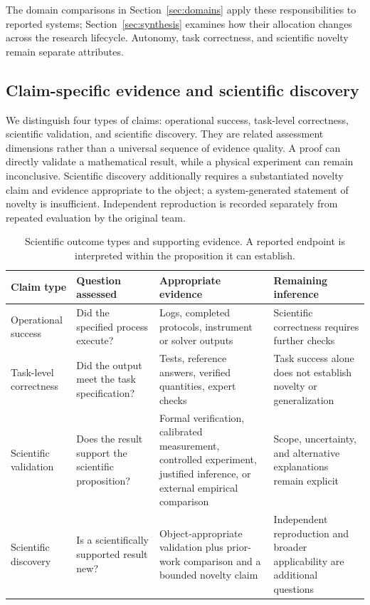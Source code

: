 The domain comparisons in Section~\ref{sec:domains} apply these responsibilities to reported systems; Section~\ref{sec:synthesis} examines how their allocation changes across the research lifecycle. Autonomy, task correctness, and scientific novelty remain separate attributes.

\subsection{Claim-specific evidence and scientific discovery}

We distinguish four types of claims: operational success, task-level correctness, scientific validation, and scientific discovery. They are related assessment dimensions rather than a universal sequence of evidence quality. A proof can directly validate a mathematical result, while a physical experiment can remain inconclusive. Scientific discovery additionally requires a substantiated novelty claim and evidence appropriate to the object; a system-generated statement of novelty is insufficient. Independent reproduction is recorded separately from repeated evaluation by the original team.

\begin{table}[H]
\caption{Scientific outcome types and supporting evidence. A reported endpoint is interpreted within the proposition it can establish.}
\label{tab:claim-evidence}
\scriptsize
\begin{tabularx}{\textwidth}{@{}p{}XXX@{}}
\toprule
Claim type & Question assessed & Appropriate evidence & Remaining inference \\
\midrule
Operational success & Did the specified process execute? & Logs, completed protocols, instrument or solver outputs & Scientific correctness requires further checks \\
Task-level correctness & Did the output meet the task specification? & Tests, reference answers, verified quantities, expert checks & Task success alone does not establish novelty or generalization \\
Scientific validation & Does the result support the scientific proposition? & Formal verification, calibrated measurement, controlled experiment, justified inference, or external empirical comparison & Scope, uncertainty, and alternative explanations remain explicit \\
Scientific discovery & Is a scientifically supported result new? & Object-appropriate validation plus prior-work comparison and a bounded novelty claim & Independent reproduction and broader applicability are additional questions \\
\bottomrule
\end{tabularx}
\end{table}

